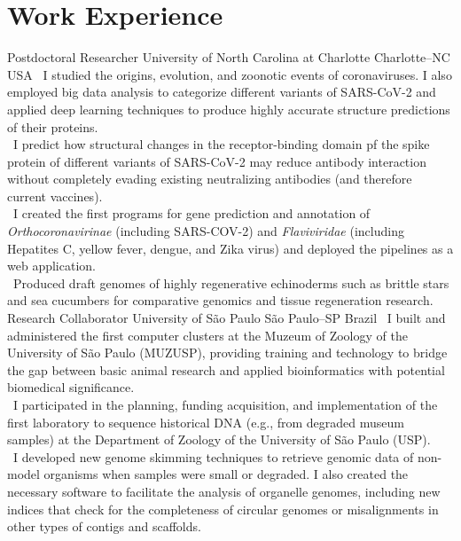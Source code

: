 \documentclass[11pt, letterpaper, sans]{moderncv}
\begin{document}
\section{Work Experience}
{Postdoctoral Researcher}
{University of North Carolina at Charlotte}
{Charlotte--NC}
{USA}
{
\textbullet~I studied the origins, evolution, and zoonotic events of coronaviruses. I also employed big data analysis to categorize different variants of SARS-CoV-2 and applied deep learning techniques to produce highly accurate structure predictions of their proteins.\\
\textbullet~I predict how structural changes in the receptor-binding domain pf the spike protein of different variants of SARS-CoV-2 may reduce antibody interaction without completely evading existing neutralizing antibodies (and therefore current vaccines).\\
\textbullet~I created the first programs for gene prediction and annotation of \textit{Orthocoronavirinae} (including SARS-COV-2) and \textit{Flaviviridae} (including Hepatites C, yellow fever, dengue, and Zika virus) and deployed the pipelines as a web application.\\
\textbullet~Produced draft genomes of highly regenerative echinoderms such as brittle stars and sea cucumbers for comparative genomics and tissue regeneration research.
}
%
{Research Collaborator}
{University of São Paulo}
{São Paulo--SP}
{Brazil}
{
\textbullet~I built and administered the first computer clusters at the Muzeum of Zoology of the University of São Paulo (MUZUSP), providing training and technology to bridge the gap between basic animal research and applied bioinformatics with potential biomedical significance.\\
\textbullet~I participated in the planning, funding acquisition, and implementation of the first laboratory to sequence historical DNA (e.g., from degraded museum samples) at the Department of Zoology of the University of São Paulo (USP).\\
\textbullet~I developed new genome skimming techniques to retrieve genomic data of non-model organisms when samples were small or degraded. I also created the necessary software to facilitate the analysis of organelle genomes, including new indices that check for the completeness of circular genomes or misalignments in other types of contigs and scaffolds.
}
\end{document}
